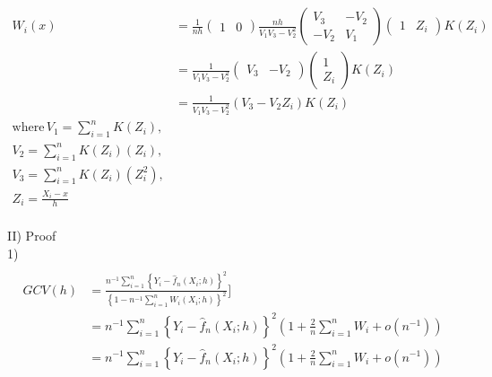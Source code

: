 \documentclass[11pt, oneside]{article}   	%
\begin{document}
\begin{equation*}
\begin{split}
\\
W_i(x) &= \frac{1}{n h} \left(\begin{array}{cccc} 1 &  0 \end{array}\right) \frac{nh}{V_1V_3 - V_2^2} \left(\begin{array}{cccc} V_3 & -V_2 \\  -V_2 & V_1 \end{array}\right)  \left(\begin{array}{cccc} 1 &  Z_i \end{array}\right) K\left(Z_i\right)\\
&= \frac{1}{V_1V_3 - V_2^2} \left(\begin{array}{cccc} V_3 &  -V_2 \end{array}\right) \left(\begin{array}{cccc} 1 \\  Z_i \end{array}\right) K\left(Z_i\right)\\
&= \frac{1}{V_1V_3 - V_2^2} \left(V_3 - V_2 Z_i\right) K\left(Z_i\right)\\
\text{where} \,V_1 = \sum_{i=1}^n K\left(Z_i\right), \\ V_2 = \sum_{i=1}^n K\left(Z_i\right)\left(Z_i\right), \\ V_3 = \sum_{i=1}^n K\left(Z_i\right)\left(Z_i^2\right), \\
Z_i = \frac{X_i-x}{h}
\\
\end{split}
\end{equation*} 

II) Proof\\
1) 
\begin{equation*}
\begin{split}
\\
G C V(h) & = \frac{n^{-1} \sum_{i=1}^n\left\{Y_i-\widehat{f}_n\left(X_i ; h\right)\right\}^2}{\left\{1-n^{-1} \sum_{i=1}^n W_i\left(X_i ; h\right)\right\}^2}]\\
& = n^{-1} \sum_{i=1}^n\left\{Y_i-\widehat{f}_n\left(X_i ; h\right)\right\}^2 \left( 1 + \frac{2}{n} \sum_{i=1}^n W_i + o(n^{-1}) \right)\\
& = n^{-1} \sum_{i=1}^n\left\{Y_i-\widehat{f}_n\left(X_i ; h\right)\right\}^2 \left( 1 + \frac{2}{n} \sum_{i=1}^n W_i + o(n^{-1}) \right)\\
\\
\end{split}
\end{equation*} 
\end{document}
